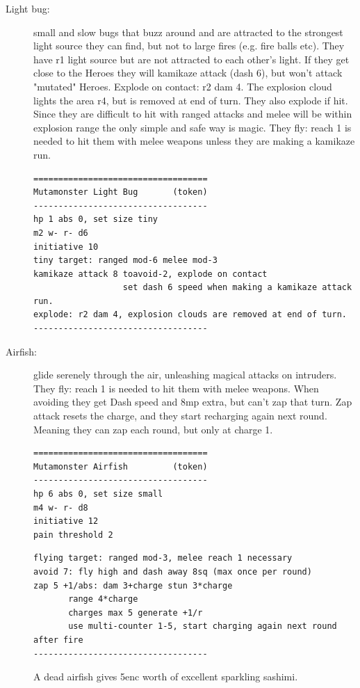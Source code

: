 \begin{description}

\item[Light bug:] small and slow bugs that buzz around and are attracted to the strongest light source they can find, but not to large fires (e.g. fire balls etc). They have r1 light source but are not attracted to each other's light. If they get close to the Heroes they will kamikaze attack (dash 6), but won't attack "mutated" Heroes. Explode on contact: r2 dam 4. The explosion cloud lights the area r4, but is removed at end of turn.
They also explode if hit. Since they are difficult to hit with ranged attacks and melee will be within explosion range the only simple and safe way is magic.
They fly: reach 1 is needed to hit them with melee weapons unless they are making a kamikaze run.
\goodbreak \small \begin{samepage} \begin{verbatim}
===================================
Mutamonster Light Bug       (token)
-----------------------------------
hp 1 abs 0, set size tiny
m2 w- r- d6
initiative 10
tiny target: ranged mod-6 melee mod-3
kamikaze attack 8 toavoid-2, explode on contact
                  set dash 6 speed when making a kamikaze attack run.
explode: r2 dam 4, explosion clouds are removed at end of turn.
-----------------------------------
\end{verbatim} \end{samepage} \normalsize


\item[Airfish:] glide serenely through the air, unleashing magical attacks on intruders. They fly: reach 1 is needed to hit them with melee weapons.
When avoiding they get Dash speed and 8mp extra, but can't zap that turn.
Zap attack resets the charge, and they start recharging again next round. Meaning they can zap each round, but only at charge 1.
\goodbreak \small \begin{samepage} \begin{verbatim}
===================================
Mutamonster Airfish         (token)
-----------------------------------
hp 6 abs 0, set size small
m4 w- r- d8
initiative 12
pain threshold 2
\end{verbatim} \end{samepage} \goodbreak \begin{samepage} \begin{verbatim}
flying target: ranged mod-3, melee reach 1 necessary
avoid 7: fly high and dash away 8sq (max once per round)
zap 5 +1/abs: dam 3+charge stun 3*charge
       range 4*charge
       charges max 5 generate +1/r
       use multi-counter 1-5, start charging again next round after fire
-----------------------------------
\end{verbatim} \end{samepage} \normalsize 
A dead airfish gives 5enc worth of excellent sparkling sashimi.



\end{description}
